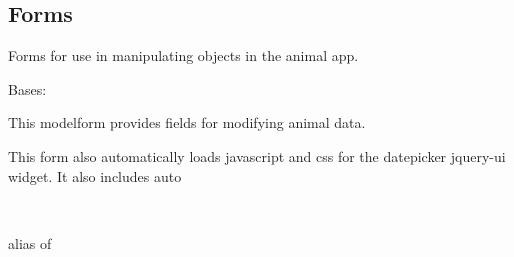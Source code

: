\documentclass[letterpaper,10pt,english]{sphinxmanual}
\begin{document}
\subsection{Forms}
\label{api:id2}\label{api:module-animal.forms}
Forms for use in manipulating objects in the animal app.


\begin{fulllineitems}
\label{api:animal.forms.AnimalForm}
Bases: 

This modelform provides fields for modifying animal data.

This form also automatically loads javascript and css for the datepicker jquery-ui widget.  It also includes auto


\begin{fulllineitems}
\label{api:animal.forms.AnimalForm.Media}
\end{fulllineitems}



\begin{fulllineitems}
\label{api:animal.forms.AnimalForm.Meta}~

\begin{fulllineitems}
\label{api:animal.forms.AnimalForm.Meta.model}
alias of 

\end{fulllineitems}


\end{fulllineitems}



\begin{fulllineitems}
\label{api:animal.forms.AnimalForm.media}
\end{fulllineitems}


\end{fulllineitems}
\end{document}
